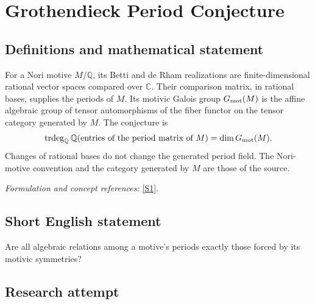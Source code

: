 \documentclass[11pt,a4paper]{article}
\newcommand{\Q}{\mathbb{Q}}
\newcommand{\C}{\mathbb{C}}
\newcommand{\sref}[2]{\hyperlink{source:#1:#2}{[S#2]}}
\newif\ifshowcatalogue
\newcommand{\cataloguescope}[1]{\ifshowcatalogue
 \paragraph{Exact scope in the supplied catalogue.}
 \begin{quote}\small #1\end{quote}\fi}
\numberwithin{equation}{section}
\begin{document}
\setcounter{section}{48}
\clearpage
\section{\texorpdfstring{Grothendieck Period Conjecture}{Grothendieck Period Conjecture}}\label{49}
\subsection{Definitions and mathematical statement}
For a Nori motive $M/\Q$, its Betti and de Rham realizations are finite-dimensional rational vector spaces compared over $\C$. Their comparison matrix, in rational bases, supplies the periods of $M$. Its motivic Galois group $G_{\rm mot}(M)$ is the affine algebraic group of tensor automorphisms of the fiber functor on the tensor category generated by $M$. The conjecture is
\[
 \operatorname{trdeg}_{\Q}\Q(\text{entries of the period matrix of }M)
 =\dim G_{\rm mot}(M).
\]
Changes of rational bases do not change the generated period field. The Nori-motive convention and the category generated by $M$ are those of the source.
\par\smallskip\textit{Formulation and concept references:} \sref{49}{1}.
\cataloguescope{Prove that for every Nori motive M over Q, trdeg\_Q Q(periods of M) equals dim G\_mot(M), the dimension of its motivic Galois group.}
\subsection{Short English statement}
Are all algebraic relations among a motive's periods exactly those forced by its motivic symmetries?
\subsection{Research attempt}
\end{document}
